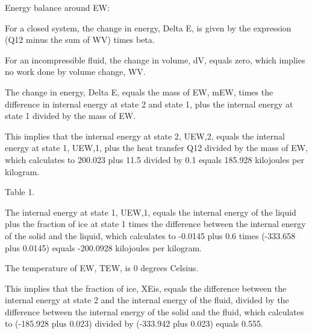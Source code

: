 Energy balance around EW:

For a closed system, the change in energy, Delta E, is given by the expression (Q12 minus the sum of WV) times beta.

For an incompressible fluid, the change in volume, dV, equals zero, which implies no work done by volume change, WV.

The change in energy, Delta E, equals the mass of EW, mEW, times the difference in internal energy at state 2 and state 1, plus the internal energy at state 1 divided by the mass of EW.

This implies that the internal energy at state 2, UEW,2, equals the internal energy at state 1, UEW,1, plus the heat transfer Q12 divided by the mass of EW, which calculates to 200.023 plus 11.5 divided by 0.1 equals 185.928 kilojoules per kilogram.

Table 1.

The internal energy at state 1, UEW,1, equals the internal energy of the liquid plus the fraction of ice at state 1 times the difference between the internal energy of the solid and the liquid, which calculates to -0.0145 plus 0.6 times (-333.658 plus 0.0145) equals -200.0928 kilojoules per kilogram.

The temperature of EW, TEW, is 0 degrees Celsius.

This implies that the fraction of ice, XEis, equals the difference between the internal energy at state 2 and the internal energy of the fluid, divided by the difference between the internal energy of the solid and the fluid, which calculates to (-185.928 plus 0.023) divided by (-333.942 plus 0.023) equals 0.555.